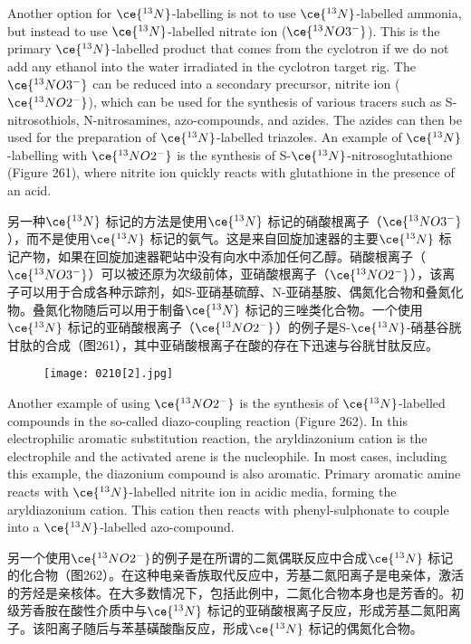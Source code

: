 \documentclass[dvipsnames, svgnames,a4paper,11pt]{article}
\begin{document}
Another option for \(\ce{^{13}N}\)-labelling is not to use \(\ce{^{13}N}\)-labelled ammonia, but instead to use \(\ce{^{13}N}\)-labelled nitrate ion (\(\ce{^{13}NO3^{-}}\)). This is the primary \(\ce{^{13}N}\)-labelled product that comes from the cyclotron if we do not add any ethanol into the water irradiated in the cyclotron target rig. The \(\ce{^{13}NO3^{-}}\) can be reduced into a secondary precursor, nitrite ion (\(\ce{^{13}NO2^{-}}\)), which can be used for the synthesis of various tracers such as S-nitrosothiols, N-nitrosamines, azo-compounds, and azides. The azides can then be used for the preparation of \(\ce{^{13}N}\)-labelled triazoles. An example of \(\ce{^{13}N}\)-labelling with \(\ce{^{13}NO2^{-}}\) is the synthesis of S-\(\ce{^{13}N}\)-nitrosoglutathione (Figure 261), where nitrite ion quickly reacts with glutathione in the presence of an acid.

另一种\(\ce{^{13}N}\) 标记的方法是使用\(\ce{^{13}N}\) 标记的硝酸根离子（\(\ce{^{13}NO3^{-}}\)），而不是使用\(\ce{^{13}N}\) 标记的氨气。这是来自回旋加速器的主要\(\ce{^{13}N}\) 标记产物，如果在回旋加速器靶站中没有向水中添加任何乙醇。硝酸根离子（\(\ce{^{13}NO3^{-}}\)）可以被还原为次级前体，亚硝酸根离子（\(\ce{^{13}NO2^{-}}\)），该离子可以用于合成各种示踪剂，如S-亚硝基硫醇、N-亚硝基胺、偶氮化合物和叠氮化物。叠氮化物随后可以用于制备\(\ce{^{13}N}\) 标记的三唑类化合物。一个使用\(\ce{^{13}N}\) 标记的亚硝酸根离子（\(\ce{^{13}NO2^{-}}\)）的例子是S-\(\ce{^{13}N}\)-硝基谷胱甘肽的合成（图261），其中亚硝酸根离子在酸的存在下迅速与谷胱甘肽反应。

\begin{figure}[h]
	\centering
    \texttt{[image: 0210[2].jpg]} 
     \label{fig261}
\end{figure}

Another example of using \(\ce{^{13}NO2^{-}}\) is the synthesis of \(\ce{^{13}N}\)-labelled compounds in the so-called diazo-coupling reaction (Figure 262). In this electrophilic aromatic substitution reaction, the aryldiazonium cation is the electrophile and the activated arene is the nucleophile. In most cases, including this example, the diazonium compound is also aromatic. Primary aromatic amine reacts with \(\ce{^{13}N}\)-labelled nitrite ion in acidic media, forming the aryldiazonium cation. This cation then reacts with phenyl-sulphonate to couple into a \(\ce{^{13}N}\)-labelled azo-compound.

另一个使用\(\ce{^{13}NO2^{-}}\)的例子是在所谓的二氮偶联反应中合成\(\ce{^{13}N}\) 标记的化合物（图262）。在这种电亲香族取代反应中，芳基二氮阳离子是电亲体，激活的芳烃是亲核体。在大多数情况下，包括此例中，二氮化合物本身也是芳香的。初级芳香胺在酸性介质中与\(\ce{^{13}N}\) 标记的亚硝酸根离子反应，形成芳基二氮阳离子。该阳离子随后与苯基磺酸酯反应，形成\(\ce{^{13}N}\) 标记的偶氮化合物。
\end{document}
